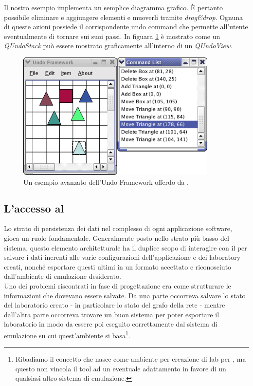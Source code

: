 Il nostro esempio implementa un semplice diagramma grafico. È pertanto possibile eliminare e aggiungere elementi e muoverli tramite \emph{drag\&{}drop}. Ognuna di queste azioni possiede il corrispondente undo command che permette all'utente eventualmente di tornare sui suoi passi.
In figuara \ref{figura:qt_undo} è mostrato come un \emph{QUndoStack} può essere mostrato graficamente all'interno di un \emph{QUndoView}.

\begin{figure}[!htb]
	\centering
	\includegraphics[width=10cm]{images/undoframeworkexample.png}
	\caption{Un esempio avanzato dell'Undo Framework offerdo da \qt{}.}
	\label{figura:qt_undo}
\end{figure}

\subsection{L'accesso al \fs{}}
Lo strato di persistenza dei dati nel complesso di ogni applicazione software, gioca un ruolo fondamentale. Generalmente posto nello strato più basso del sistema, questo elemento architetturale ha il duplice scopo di interagire con il \fs{} per salvare i dati inerenti alle varie configurazioni dell'applicazione e dei laboratory creati, nonché esportare questi ultimi in un formato accettato e riconosciuto dall'ambiente di emulazione desiderato.\\
Uno dei problemi riscontrati in fase di progettazione era come strutturare le informazioni che dovevano essere salvate. Da una parte occorreva salvare lo stato del laboratorio creato - in particolare lo stato del grafo della rete - mentre dall'altra parte occorreva trovare un buon sistema per poter esportare il laboratorio in modo da essere poi eseguito correttamente dal sistema di emulazione su cui quest'ambiente si basa\footnote{Ribadiamo il concetto che \visualnetkit{} nasce come ambiente per creazione di lab per \netkit{}, ma questo non vincola il tool ad un eventuale adattamento in favore di un qualsiasi altro sistema di emulazione.}.

